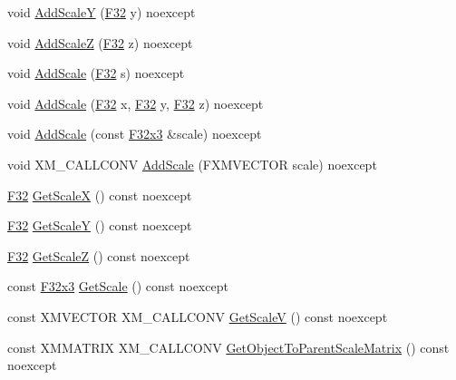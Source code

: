 \begin{DoxyCompactItemize}
void \hyperlink{classmage_1_1_transform_a6f3dbff67c49f2d920c25d46cf25d0ee}{Add\+ScaleY} (\hyperlink{namespacemage_aa97e833b45f06d60a0a9c4fc22ae02c0}{F32} y) noexcept
\item 
void \hyperlink{classmage_1_1_transform_ae9aa81d2f6af6422a261878b63a0e5de}{Add\+ScaleZ} (\hyperlink{namespacemage_aa97e833b45f06d60a0a9c4fc22ae02c0}{F32} z) noexcept
\item 
void \hyperlink{classmage_1_1_transform_a3b90baf1db39dd3dc17a9203b4383073}{Add\+Scale} (\hyperlink{namespacemage_aa97e833b45f06d60a0a9c4fc22ae02c0}{F32} s) noexcept
\item 
void \hyperlink{classmage_1_1_transform_a9159be1589e53e93d50cf3dad60e7f75}{Add\+Scale} (\hyperlink{namespacemage_aa97e833b45f06d60a0a9c4fc22ae02c0}{F32} x, \hyperlink{namespacemage_aa97e833b45f06d60a0a9c4fc22ae02c0}{F32} y, \hyperlink{namespacemage_aa97e833b45f06d60a0a9c4fc22ae02c0}{F32} z) noexcept
\item 
void \hyperlink{classmage_1_1_transform_aa5c1edbdcec945f4587c6075f2101b5c}{Add\+Scale} (const \hyperlink{namespacemage_a73fbe0da4b8d5bc156bb8453e5b63a17}{F32x3} \&scale) noexcept
\item 
void X\+M\+\_\+\+C\+A\+L\+L\+C\+O\+NV \hyperlink{classmage_1_1_transform_a2e424087adc2332bb254dc6162202866}{Add\+Scale} (F\+X\+M\+V\+E\+C\+T\+OR scale) noexcept
\item 
\hyperlink{namespacemage_aa97e833b45f06d60a0a9c4fc22ae02c0}{F32} \hyperlink{classmage_1_1_transform_a86eff370d6cb37a7aa5f7d78d4cf3cf4}{Get\+ScaleX} () const noexcept
\item 
\hyperlink{namespacemage_aa97e833b45f06d60a0a9c4fc22ae02c0}{F32} \hyperlink{classmage_1_1_transform_a17bd579657e31fbdc1eacec0836140c5}{Get\+ScaleY} () const noexcept
\item 
\hyperlink{namespacemage_aa97e833b45f06d60a0a9c4fc22ae02c0}{F32} \hyperlink{classmage_1_1_transform_aa7ba1aa16161ec656b2828c2433f6dbd}{Get\+ScaleZ} () const noexcept
\item 
const \hyperlink{namespacemage_a73fbe0da4b8d5bc156bb8453e5b63a17}{F32x3} \hyperlink{classmage_1_1_transform_a6d166fd4201a61c24b8d96cd5bba45f8}{Get\+Scale} () const noexcept
\item 
const X\+M\+V\+E\+C\+T\+OR X\+M\+\_\+\+C\+A\+L\+L\+C\+O\+NV \hyperlink{classmage_1_1_transform_acb6e1da2673c6b359fc8b891f3f556ec}{Get\+ScaleV} () const noexcept
\item 
const X\+M\+M\+A\+T\+R\+IX X\+M\+\_\+\+C\+A\+L\+L\+C\+O\+NV \hyperlink{classmage_1_1_transform_af69febeb1c8795d4d3e71a712e4ab3b8}{Get\+Object\+To\+Parent\+Scale\+Matrix} () const noexcept

\end{DoxyCompactItemize}
